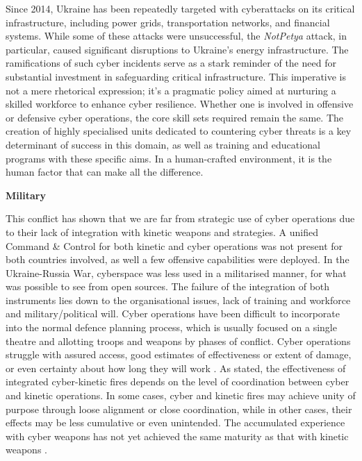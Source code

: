 Since 2014, Ukraine has been repeatedly targeted with cyberattacks on its critical infrastructure, including power grids, transportation networks, and financial systems. While some of these attacks were unsuccessful, the \textit{NotPetya} attack, in particular, caused significant disruptions to Ukraine's energy infrastructure. The ramifications of such cyber incidents serve as a stark reminder of the need for substantial investment in safeguarding critical infrastructure. This imperative is not a mere rhetorical expression; it's a pragmatic policy aimed at nurturing a skilled workforce to enhance cyber resilience. Whether one is involved in offensive or defensive cyber operations, the core skill sets required remain the same. The creation of highly specialised units dedicated to countering cyber threats is a key determinant of success in this domain, as well as training and educational programs with these specific aims. In a human-crafted environment, it is the human factor that can make all the difference.

\textbf{Military}

This conflict has shown that we are far from strategic use of cyber operations due to their lack of integration with kinetic weapons and strategies. A unified Command \& Control for both kinetic and cyber operations was not present for both countries involved, as well a few offensive capabilities were deployed. In the Ukraine-Russia War, cyberspace was less used in a militarised manner, for what was possible to see from open sources. The failure of the integration of both instruments lies down to the organisational issues, lack of training and workforce and military/political will.  Cyber operations have been difficult to incorporate into the normal defence planning process, which is usually focused on a single theatre and allotting troops and weapons by phases of conflict. Cyber operations struggle with assured access, good estimates of effectiveness or extent of damage, or even certainty about how long they will work \autocite{lonergan_2021_cyber}. As \textcite{baetman_2022_russias} stated, the effectiveness of integrated cyber-kinetic fires depends on the level of coordination between cyber and kinetic operations. In some cases, cyber and kinetic fires may achieve unity of purpose through loose alignment or close coordination, while in other cases, their effects may be less cumulative or even unintended. The accumulated experience with cyber weapons has not yet achieved the same maturity as that with kinetic weapons \autocite{dykstra_2020_differentiating}. 




